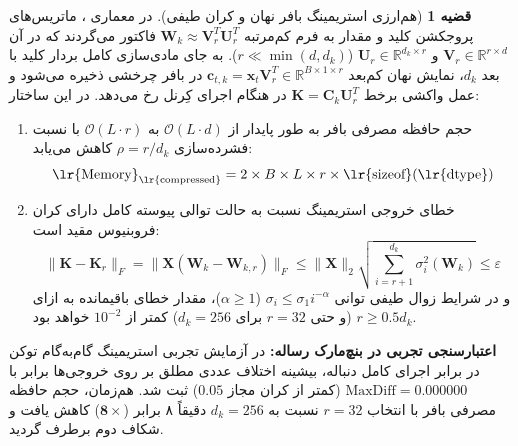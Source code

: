 \documentclass[12pt,a4paper]{report}
\theoremstyle{definition}
\newtheorem{theorem}{قضیه}[chapter]
\begin{document}
\begin{theorem}[هم‌ارزی استریمینگ بافر نهان و کران طیفی]
\label{thm:asvd_streaming_equivalence}
در معماری ، ماتریس‌های پروجکشن کلید و مقدار به فرم کم‌مرتبه $\mathbf{W}_k \approx \mathbf{V}_r^T \mathbf{U}_r^T$ فاکتور می‌گردند که در آن $\mathbf{V}_r \in \mathbb{R}^{r \times d}$ و $\mathbf{U}_r \in \mathbb{R}^{d_k \times r}$ ($r \ll \min(d, d_k)$). به جای مادی‌سازی کامل بردار کلید با بعد $d_k$، نمایش نهان کم‌بعد $\mathbf{c}_{t, k} = \mathbf{x}_t \mathbf{V}_r^T \in \mathbb{R}^{B \times 1 \times r}$ در بافر چرخشی  ذخیره می‌شود و عمل واکشی برخط $\mathbf{K} = \mathbf{C}_k \mathbf{U}_r^T$ در هنگام اجرای کِرنل رخ می‌دهد. در این ساختار:
\begin{enumerate}
    \item حجم حافظه مصرفی بافر  به طور پایدار از $\mathcal{O}(L \cdot d)$ به $\mathcal{O}(L \cdot r)$ با نسبت فشرده‌سازی $\rho = r/d_k$ کاهش می‌یابد:
    \begin{equation}
    \text{\lr{Memory}}_{\text{\lr{compressed}}} = 2 \times B \times L \times r \times \text{\lr{sizeof}}(\text{\lr{dtype}})
    \end{equation}
    \item خطای خروجی استریمینگ نسبت به حالت توالی پیوسته کامل دارای کران فروبنیوس مقید است:
    \begin{equation}
    \|\mathbf{K} - \mathbf{K}_r\|_F = \|\mathbf{X}(\mathbf{W}_k - \mathbf{W}_{k, r})\|_F \le \|\mathbf{X}\|_2 \sqrt{\sum_{i=r+1}^{d_k} \sigma_i^2(\mathbf{W}_k)} \le \varepsilon
    \end{equation}
    و در شرایط زوال طیفی توانی $\sigma_i \le \sigma_1 i^{-\alpha}$ ($\alpha \ge 1$)، مقدار خطای باقیمانده به ازای $r \ge 0.5 d_k$ (و حتی $r=32$ برای $d_k=256$) کمتر از $10^{-2}$ خواهد بود.
\end{enumerate}
\end{theorem}

\textbf{اعتبارسنجی تجربی در بنچ‌مارک رساله:} در آزمایش تجربی استریمینگ گام‌به‌گام توکن در برابر اجرای کامل دنباله، بیشینه اختلاف عددی مطلق بر روی خروجی‌ها برابر با $\text{MaxDiff} = 0.000000$ (کمتر از کران مجاز $0.05$) ثبت شد. هم‌زمان، حجم حافظه مصرفی بافر با انتخاب $r=32$ نسبت به $d_k=256$ دقیقاً ۸ برابر ($\mathbf{8\times}$) کاهش یافت و شکاف دوم برطرف گردید.
\end{document}
